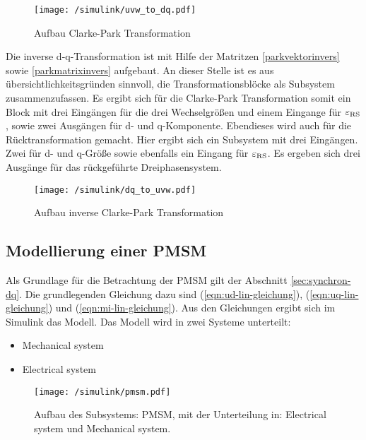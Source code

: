 \begin{figure}[h!]
	\centering
	\texttt{[image: /simulink/uvw\_to\_dq.pdf]}
	\label{fig:uvw_to_dq}
	\caption{Aufbau Clarke-Park Transformation}
\end{figure}

Die inverse d-q-Transformation ist mit Hilfe der Matritzen \ref{parkvektorinvers} sowie \ref{parkmatrixinvers} aufgebaut.
An dieser Stelle ist es aus übersichtlichkeitsgründen sinnvoll, die Transformationsblöcke als Subsystem zusammenzufassen.
Es ergibt sich für die Clarke-Park Transformation somit ein Block mit drei Eingängen für die drei Wechselgrößen und einem Eingange für $\varepsilon_{\mathrm{RS}}$, sowie zwei Ausgängen für d- und q-Komponente.
Ebendieses wird auch für die Rücktransformation gemacht. 
Hier ergibt sich ein Subsystem mit drei Eingängen. 
Zwei für d- und q-Größe sowie ebenfalls ein Eingang für $\varepsilon_{\mathrm{RS}}$.
Es ergeben sich drei Ausgänge für das rückgeführte Dreiphasensystem.

\begin{figure}[h!]
	\centering
	\texttt{[image: /simulink/dq\_to\_uvw.pdf]}
	\label{fig:dq_to_uvw}
	\caption{Aufbau inverse Clarke-Park Transformation}
\end{figure}

\newpage

\subsection{Modellierung einer PMSM}

Als Grundlage für die Betrachtung der PMSM gilt der Abschnitt \ref{sec:synchron-dq}.
Die grundlegenden Gleichung dazu sind (\ref{eqn:ud-lin-gleichung}), (\ref{eqn:uq-lin-gleichung}) und (\ref{eqn:mi-lin-gleichung}).
Aus den Gleichungen ergibt sich im Simulink das Modell.
Das Modell wird in zwei Systeme unterteilt:

\begin{itemize}
	\item Mechanical system
	\item Electrical system
\end{itemize}

\begin{figure}[h!]
	\centering
	\texttt{[image: /simulink/pmsm.pdf]}
	\label{fig:pmsm}
	\caption{Aufbau des Subsystems: PMSM, mit der Unterteilung in: Electrical system und Mechanical system.}
\end{figure}

